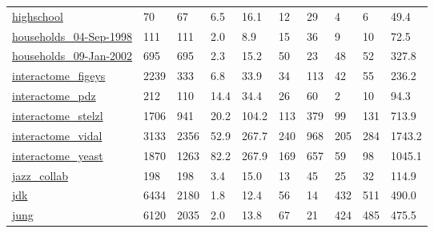 \begin{longtable}{llllllllll}
 \href{http://konect.cc/networks/moreno_highschool}{highschool}                                                             & 70         & 67    & 6.5    & 16.1   & 12    & 29     & 4      & 6      & 49.4    \\
 \href{https://doi.org/10.5061/dryad.5b8n621}{households\_04-Sep-1998}                                                       & 111        & 111   & 2.0    & 8.9    & 15    & 36     & 9      & 10     & 72.5    \\
 \href{https://doi.org/10.5061/dryad.5b8n621}{households\_09-Jan-2002}                                                       & 695        & 695   & 2.3    & 15.2   & 50    & 23     & 48     & 52     & 327.8   \\
 \href{http://konect.cc/networks/maayan-figeys}{interactome\_figeys}                                                         & 2239       & 333   & 6.8    & 33.9   & 34    & 113    & 42     & 55     & 236.2   \\
 \href{http://konect.cc/networks/maayan-pdzbase}{interactome\_pdz}                                                           & 212        & 110   & 14.4   & 34.4   & 26    & 60     & 2      & 10     & 94.3    \\
 \href{http://konect.cc/networks/maayan-Stelzl}{interactome\_stelzl}                                                         & 1706       & 941   & 20.2   & 104.2  & 113   & 379    & 99     & 131    & 713.9   \\
 \href{http://konect.cc/networks/maayan-vidal}{interactome\_vidal}                                                           & 3133       & 2356  & 52.9   & 267.7  & 240   & 968    & 205    & 284    & 1743.2  \\
 \href{http://konect.cc/networks/moreno_propro}{interactome\_yeast}                                                          & 1870       & 1263  & 82.2   & 267.9  & 169   & 657    & 59     & 98     & 1045.1  \\
 \href{https://deim.urv.cat/~alexandre.arenas/data/welcome.htm}{jazz\_collab}                                                & 198        & 198   & 3.4    & 15.0   & 13    & 45     & 25     & 32     & 114.9   \\
 \href{http://konect.cc/networks/subelj_jdk}{jdk}                                                                           & 6434       & 2180  & 1.8    & 12.4   & 56    & 14     & 432    & 511    & 490.0   \\
 \href{http://konect.cc/networks/subelj_jung-j}{jung}                                                                       & 6120       & 2035  & 2.0    & 13.8   & 67    & 21     & 424    & 485    & 475.5   \\

\end{longtable}
